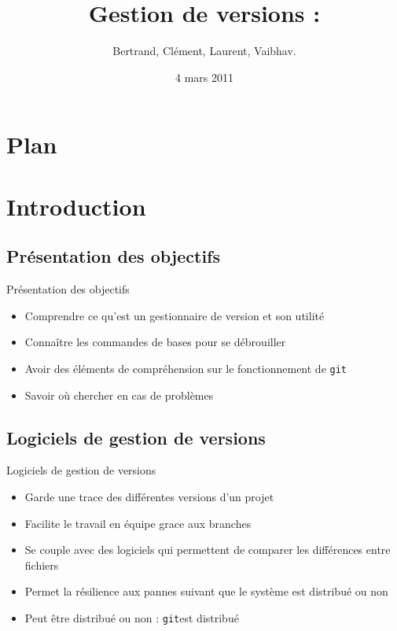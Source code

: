 \documentclass{beamer}
\title[ROSE]{Gestion de versions : \git}
\author{Bertrand, Clément, Laurent, Vaibhav.}
\institute{Télécom ParisTech}
\date{4 mars 2011}
\newcommand{\git}{\texttt{git}}
\begin{document}
\begin{frame}
  \titlepage
\end{frame}

\section*{Plan}

\section{Introduction}
\subsection*{Présentation des objectifs}
\begin{frame}{Présentation des objectifs}
  \begin{itemize}
  \item Comprendre ce qu'est un gestionnaire de version et son utilité
  \item Connaître les commandes de bases pour se débrouiller
  \item Avoir des éléments de compréhension sur le fonctionnement de \git
  \item Savoir où chercher en cas de problèmes
  \end{itemize}
\end{frame}

\subsection*{Logiciels de gestion de versions}
\begin{frame}{Logiciels de gestion de versions}
  \begin{itemize}
  \item Garde une trace des différentes versions d'un projet
  \item Facilite le travail en équipe grace aux branches
  \item Se couple avec des logiciels qui permettent de comparer les différences entre fichiers
  \item Permet la résilience aux pannes suivant que le système est distribué ou non
  \item Peut être distribué ou non : \git est distribué
  \end{itemize}
\end{frame}
\end{document}
